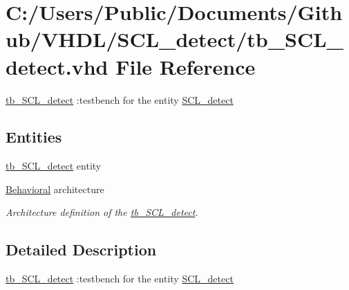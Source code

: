 \hypertarget{tb___s_c_l__detect_8vhd}{}\section{C\+:/\+Users/\+Public/\+Documents/\+Github/\+V\+H\+D\+L/\+S\+C\+L\+\_\+detect/tb\+\_\+\+S\+C\+L\+\_\+detect.vhd File Reference}
\label{tb___s_c_l__detect_8vhd}


\hyperlink{classtb___s_c_l__detect}{tb\+\_\+\+S\+C\+L\+\_\+detect} \+:testbench for the entity \hyperlink{class_s_c_l__detect}{S\+C\+L\+\_\+detect}  


\subsection*{Entities}
\begin{DoxyCompactItemize}
\item 
\hyperlink{classtb___s_c_l__detect}{tb\+\_\+\+S\+C\+L\+\_\+detect} entity
\item 
\hyperlink{classtb___s_c_l__detect_1_1_behavioral}{Behavioral} architecture
\begin{DoxyCompactList}\small\item\em Architecture definition of the \hyperlink{classtb___s_c_l__detect}{tb\+\_\+\+S\+C\+L\+\_\+detect}. \end{DoxyCompactList}\end{DoxyCompactItemize}


\subsection{Detailed Description}
\hyperlink{classtb___s_c_l__detect}{tb\+\_\+\+S\+C\+L\+\_\+detect} \+:testbench for the entity \hyperlink{class_s_c_l__detect}{S\+C\+L\+\_\+detect} 


